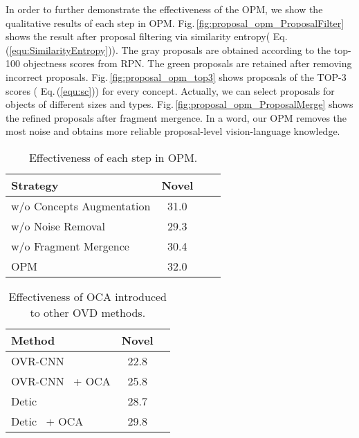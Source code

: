 \documentclass[10pt,twocolumn,letterpaper]{article}
\begin{document}
In order to further demonstrate the effectiveness of the OPM, we  show the qualitative results of each step in OPM.  Fig.\,\ref{fig:proposal_opm_ProposalFilter} shows the result after proposal filtering via similarity entropy( Eq.\,(\ref{equ:SimilarityEntropy})). The gray proposals are obtained according to the top-100 objectness scores from RPN. The green proposals are retained after removing incorrect proposals. 
Fig.\,\ref{fig:proposal_opm_top3} shows proposals of the TOP-3  scores ( Eq.\,(\ref{equ:sc})) for every concept. Actually, we can select proposals for objects of different sizes and types. Fig.\,\ref{fig:proposal_opm_ProposalMerge} shows the refined proposals after fragment mergence. In a word, our OPM removes the most noise and obtains more reliable proposal-level vision-language knowledge.

\begin{table}[t]
        \centering
        \caption{Effectiveness of each step in OPM.}
        \footnotesize{
         \begin{tabular}{l|c|c|c}
            \toprule
            Strategy & Novel & \color{gray}{Base} & \color{gray}{All} \\
            \midrule
            w/o Concepts Augmentation & 31.0 &\color{gray}{52.9} &\color{gray}{47.2} \\
            w/o Noise Removal &29.3 &\color{gray}{52.4} &\color{gray}{46.5} \\
            w/o Fragment Mergence &30.4 &\color{gray}{52.8} &\color{gray}{47.0} \\
            \midrule
            OPM  &32.0 &\color{gray}{53.1} &\color{gray}{47.5}\\
            \bottomrule
        \end{tabular}
        }
        \label{tab:ablation_on_OPM}
\end{table}
    
\begin{table}[t]
    \centering
    \caption{Effectiveness of OCA introduced to other OVD methods.}
    \footnotesize{
    \begin{tabular}{l|c|c}
            \toprule
            Method & Novel & \color{gray}{All} \\
            \midrule
            OVR-CNN~\cite{ovrcnn} &22.8	&\color{gray}{44.3} \\
OVR-CNN~\cite{ovrcnn} + OCA &25.8	& \color{gray}{45.3} \\
            \midrule
            Detic~\cite{detic} &28.7	&\color{gray}{45.1} \\
Detic~\cite{detic} + OCA &29.8	&\color{gray}{46.8} \\ 
            \bottomrule
    \end{tabular}
    }
    \label{tab:CAug_CBA}
    \vspace{-1em}
    
\end{table}
\end{document}
